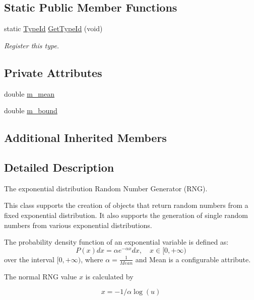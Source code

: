 \subsection*{Static Public Member Functions}
\begin{DoxyCompactItemize}
\item 
static \hyperlink{classns3_1_1TypeId}{Type\+Id} \hyperlink{classns3_1_1ExponentialRandomVariable_ad5fe09ca96d45ee9e10b88bdb7f747bf}{Get\+Type\+Id} (void)
\begin{DoxyCompactList}\small\item\em Register this type. \end{DoxyCompactList}\end{DoxyCompactItemize}
\subsection*{Private Attributes}
\begin{DoxyCompactItemize}
\item 
double \hyperlink{classns3_1_1ExponentialRandomVariable_a8af9234fcf986a6dfe67e43c3b83db1d}{m\+\_\+mean}
\item 
double \hyperlink{classns3_1_1ExponentialRandomVariable_a90e6d366c4a2c66ccf78268f75112290}{m\+\_\+bound}
\end{DoxyCompactItemize}
\subsection*{Additional Inherited Members}


\subsection{Detailed Description}
The exponential distribution Random Number Generator (R\+NG). 

This class supports the creation of objects that return random numbers from a fixed exponential distribution. It also supports the generation of single random numbers from various exponential distributions.

The probability density function of an exponential variable is defined as\+: \[ P(x) dx = \alpha e^{-\alpha x} dx, \quad x \in [0, +\infty) \] over the interval $[0, +\infty)$, where $ \alpha = \frac{1}{Mean} $ and {\ttfamily Mean} is a configurable attribute.

The normal R\+NG value $x$ is calculated by

\[ x = - 1/\alpha \log(u) \]


